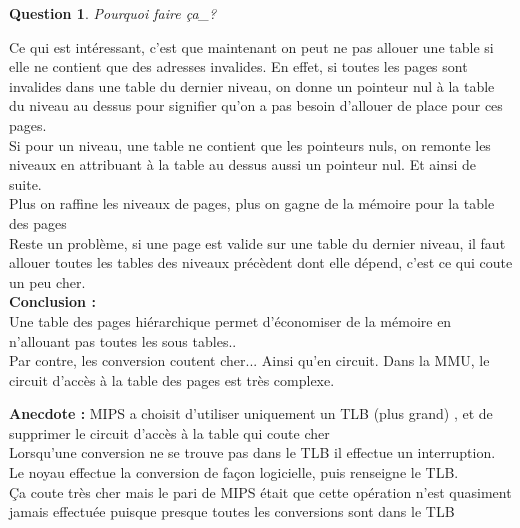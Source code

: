 \documentclass[12pt,a4paper]{report}
\newtheorem*{q}{Question}
\begin{document}
\begin{q}Pourquoi faire ça_?\end{q}
Ce qui est intéressant, c'est que maintenant on peut ne pas allouer une table si elle ne contient que des adresses invalides. En effet, si toutes les pages sont invalides dans une table du dernier niveau, on donne un pointeur nul à la table du niveau au dessus pour signifier qu'on a pas besoin d'allouer de place pour ces pages.\\
Si pour un niveau, une table ne contient que les pointeurs nuls, on remonte les niveaux en attribuant à la table au dessus aussi un pointeur nul. Et ainsi de suite.\\
Plus on raffine les niveaux de pages, plus on gagne de la mémoire pour la table des pages\\
Reste un problème, si une page est valide sur une table du dernier niveau, il faut allouer toutes les tables des niveaux précèdent dont elle dépend, c'est ce qui coute un peu cher.\\

\textbf{Conclusion :}\\
Une table des pages hiérarchique permet d'économiser de la mémoire en n'allouant pas toutes les sous tables..\\
Par contre, les conversion coutent cher... Ainsi qu'en circuit. Dans la MMU, le circuit d'accès à la table des pages est très complexe.\\

\begin{center}
\end{center}

\textbf{Anecdote :} MIPS a choisit d’utiliser uniquement un TLB (plus grand) , et de supprimer le circuit d’accès à la table qui coute cher\\
Lorsqu'une conversion ne se trouve pas dans le TLB il effectue un interruption. Le noyau effectue la conversion de façon logicielle, puis renseigne le TLB. \\
Ça coute très cher mais le pari de MIPS était que cette opération n'est quasiment jamais effectuée puisque presque toutes les conversions sont dans le TLB
\end{document}
